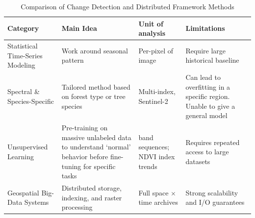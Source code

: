\begin{table}[t]
  \centering
  \caption{Comparison of Change Detection and Distributed Framework Methods}
  \label{tab:method-comparison}
  \small
  \begin{tabularx}{\textwidth}{@{} >{\hsize=1.0\hsize\RaggedRight}X >{\hsize=1.2\hsize\RaggedRight}X >{\hsize=0.8\hsize\RaggedRight}X >{\hsize=1.0\hsize\RaggedRight}X @{}}
    \toprule
    \textbf{Category} & \textbf{Main Idea} & \textbf{Unit of analysis} & \textbf{Limitations} \\ 
    \midrule
    Statistical Time-Series Modeling\cite{bfast, nrt-anomalies} & Work around seasonal pattern & Per-pixel of image & Require large historical baseline \\ \addlinespace
    Spectral \& Species-Specific   \cite{ts-sentinel,jamali2024, bark-beetle} & Tailored method based on forest type or tree species & Multi-index, Sentinel-2 & Can lead to overfitting in a specific region. Unable to give a general model\\ \addlinespace
    Unsupervised Learning  \cite{ndvi, dl-forest, Zhang25082025, Prithvi-100M-preprint} & Pre-training on massive unlabeled data to understand `normal' behavior before fine-tuning for specific tasks &  band sequences; NDVI index trends & Requires repeated access to large datasets \\ \addlinespace
    Geospatial Big-Data Systems \cite{rdpro, icde-geospatial} & Distributed storage, indexing, and raster processing & Full space $\times$ time archives & Strong scalability and I/O guarantees \\ 
    \bottomrule
   \end{tabularx}
\end{table}


